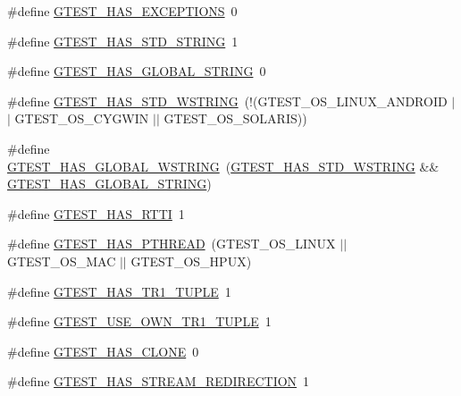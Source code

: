 \begin{DoxyCompactItemize}
\item 
\#define \hyperlink{gtest-port_8h_aedcf220690e6589d0fc2bd3db768ea66}{\-G\-T\-E\-S\-T\-\_\-\-H\-A\-S\-\_\-\-E\-X\-C\-E\-P\-T\-I\-O\-N\-S}~0
\item 
\#define \hyperlink{gtest-port_8h_adba1121430c11cee8ba0c74e8cf6aa40}{\-G\-T\-E\-S\-T\-\_\-\-H\-A\-S\-\_\-\-S\-T\-D\-\_\-\-S\-T\-R\-I\-N\-G}~1
\item 
\#define \hyperlink{gtest-port_8h_a6ab57c4a17233dd4ed30c2926bb99cc5}{\-G\-T\-E\-S\-T\-\_\-\-H\-A\-S\-\_\-\-G\-L\-O\-B\-A\-L\-\_\-\-S\-T\-R\-I\-N\-G}~0
\item 
\#define \hyperlink{gtest-port_8h_a6e087748d8bbd2ca57c487b6ad268670}{\-G\-T\-E\-S\-T\-\_\-\-H\-A\-S\-\_\-\-S\-T\-D\-\_\-\-W\-S\-T\-R\-I\-N\-G}~(!(\-G\-T\-E\-S\-T\-\_\-\-O\-S\-\_\-\-L\-I\-N\-U\-X\-\_\-\-A\-N\-D\-R\-O\-I\-D $|$$|$ \-G\-T\-E\-S\-T\-\_\-\-O\-S\-\_\-\-C\-Y\-G\-W\-I\-N $|$$|$ \-G\-T\-E\-S\-T\-\_\-\-O\-S\-\_\-\-S\-O\-L\-A\-R\-I\-S))
\item 
\#define \hyperlink{gtest-port_8h_afca9ecaf5846561187a15b75013aa85b}{\-G\-T\-E\-S\-T\-\_\-\-H\-A\-S\-\_\-\-G\-L\-O\-B\-A\-L\-\_\-\-W\-S\-T\-R\-I\-N\-G}~(\hyperlink{gtest-port_8h_a6e087748d8bbd2ca57c487b6ad268670}{\-G\-T\-E\-S\-T\-\_\-\-H\-A\-S\-\_\-\-S\-T\-D\-\_\-\-W\-S\-T\-R\-I\-N\-G} \&\& \hyperlink{gtest-port_8h_a6ab57c4a17233dd4ed30c2926bb99cc5}{\-G\-T\-E\-S\-T\-\_\-\-H\-A\-S\-\_\-\-G\-L\-O\-B\-A\-L\-\_\-\-S\-T\-R\-I\-N\-G})
\item 
\#define \hyperlink{gtest-port_8h_a9ba781217167f905bff2f1c410a97930}{\-G\-T\-E\-S\-T\-\_\-\-H\-A\-S\-\_\-\-R\-T\-T\-I}~1
\item 
\#define \hyperlink{gtest-port_8h_a3341397e1952de0b9cd88762d4d3ae4b}{\-G\-T\-E\-S\-T\-\_\-\-H\-A\-S\-\_\-\-P\-T\-H\-R\-E\-A\-D}~(\-G\-T\-E\-S\-T\-\_\-\-O\-S\-\_\-\-L\-I\-N\-U\-X $|$$|$ \-G\-T\-E\-S\-T\-\_\-\-O\-S\-\_\-\-M\-A\-C $|$$|$ \-G\-T\-E\-S\-T\-\_\-\-O\-S\-\_\-\-H\-P\-U\-X)
\item 
\#define \hyperlink{gtest-port_8h_a6de49dd4cbae1db15dc6edca3b179d1b}{\-G\-T\-E\-S\-T\-\_\-\-H\-A\-S\-\_\-\-T\-R1\-\_\-\-T\-U\-P\-L\-E}~1
\item 
\#define \hyperlink{gtest-port_8h_afa144e5f5d039db0df873e7ad48c1fda}{\-G\-T\-E\-S\-T\-\_\-\-U\-S\-E\-\_\-\-O\-W\-N\-\_\-\-T\-R1\-\_\-\-T\-U\-P\-L\-E}~1
\item 
\#define \hyperlink{gtest-port_8h_a40c075a7f969a694e59532356be59fd5}{\-G\-T\-E\-S\-T\-\_\-\-H\-A\-S\-\_\-\-C\-L\-O\-N\-E}~0
\item 
\#define \hyperlink{gtest-port_8h_add695166eb7b691f93777525d5881062}{\-G\-T\-E\-S\-T\-\_\-\-H\-A\-S\-\_\-\-S\-T\-R\-E\-A\-M\-\_\-\-R\-E\-D\-I\-R\-E\-C\-T\-I\-O\-N}~1

\end{DoxyCompactItemize}
